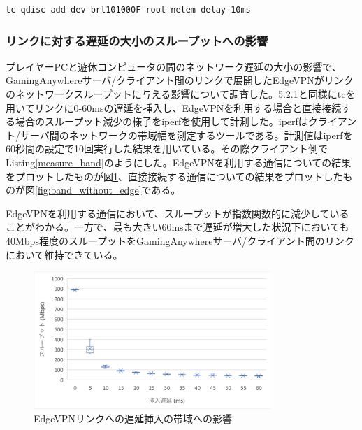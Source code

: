 \begin{lstlisting}[caption=遅延挿入,label=add_ratency]
    tc qdisc add dev brl101000F root netem delay 10ms
\end{lstlisting}

\subsubsection{リンクに対する遅延の大小のスループットへの影響}
プレイヤーPCと遊休コンピュータの間のネットワーク遅延の大小の影響で、GamingAnywhereサーバ/クライアント間のリンクで展開したEdgeVPNがリンクのネットワークスループットに与える影響について調査した。5.2.1と同様にtcを用いてリンクに0-60msの遅延を挿入し、EdgeVPNを利用する場合と直接接続する場合のスループット減少の様子をiperf\cite{iperf}を使用して計測した。iperfはクライアント/サーバ間のネットワークの帯域幅を測定するツールである。計測値はiperfを60秒間の設定で10回実行した結果を用いている。その際クライアント側でListing\ref{measure_band}のようにした。EdgeVPNを利用する通信についての結果をプロットしたものが図\ref{fig:band_with_edge}、直接接続する通信についての結果をプロットしたものが図\ref{fig:band_without_edge}である。

EdgeVPNを利用する通信において、スループットが指数関数的に減少していることがわかる。一方で、最も大きい60msまで遅延が増大した状況下においても40Mbps程度のスループットをGamingAnywhereサーバ/クライアント間のリンクにおいて維持できている。

\begin{figure}[h!]
    \centering
    \includegraphics[width=0.8\textwidth,keepaspectratio,clip]{img/bandwidth_withEdgeVPN.pdf}
    \caption{EdgeVPNリンクへの遅延挿入の帯域への影響}
    \label{fig:band_with_edge}
\end{figure}

